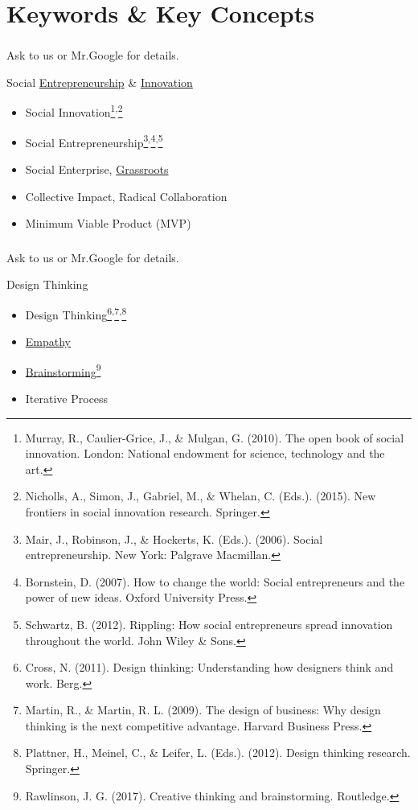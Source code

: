 \documentclass[dvipdfmx,10pt]{beamer}
\newcommand{\ft}{\frametitle}
\begin{document}
\section{Keywords \& Key Concepts} 
\begin{frame}\ft{\insertsection}
Ask to us or Mr.Google for details.
\begin{exampleblock}{Social \href{https://en.wikipedia.org/wiki/Entrepreneurship}{Entrepreneurship} \& \href{https://en.wikipedia.org/wiki/Innovation}{Innovation}}
\begin{itemize}
\item Social Innovation\footnote{Murray, R., Caulier-Grice, J., \& Mulgan, G. (2010). The open book of social innovation. London: National endowment for science, technology and the art.}\textsuperscript{,}\footnote{Nicholls, A., Simon, J., Gabriel, M., \& Whelan, C. (Eds.). (2015). New frontiers in social innovation research. Springer.}
\item Social Entrepreneurship\footnote{Mair, J., Robinson, J., \& Hockerts, K. (Eds.). (2006). Social entrepreneurship. New York: Palgrave Macmillan.}\textsuperscript{,}\footnote{Bornstein, D. (2007). How to change the world: Social entrepreneurs and the power of new ideas. Oxford University Press.}\textsuperscript{,}\footnote{Schwartz, B. (2012). Rippling: How social entrepreneurs spread innovation throughout the world. John Wiley \& Sons.}
\item Social Enterprise, \href{https://en.wikipedia.org/wiki/Grassroots}{Grassroots}
\item Collective Impact, Radical Collaboration
\item Minimum Viable Product (MVP)
\end{itemize}
\end{exampleblock}
\end{frame}
\begin{frame}\ft{\insertsection}
Ask to us or Mr.Google for details.
\begin{exampleblock}{Design Thinking}
\begin{itemize}
    \item Design Thinking\footnote{Cross, N. (2011). Design thinking: Understanding how designers think and work. Berg.}\textsuperscript{,}\footnote{Martin, R., \& Martin, R. L. (2009). The design of business: Why design thinking is the next competitive advantage. Harvard Business Press.}\textsuperscript{,}\footnote{Plattner, H., Meinel, C., \& Leifer, L. (Eds.). (2012). Design thinking research. Springer.}
    \item \href{https://en.wikipedia.org/wiki/Empathy}{Empathy}
    \item \href{https://en.wikipedia.org/wiki/Brainstorming}{Brainstorming}\footnote{Rawlinson, J. G. (2017). Creative thinking and brainstorming. Routledge.}
    \item Iterative Process
\end{itemize}
\end{exampleblock}
\end{frame}
\end{document}
